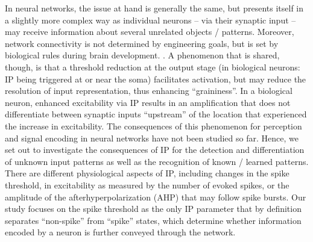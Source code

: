 In neural networks, the issue at hand is generally the same,
        but presents itself in a slightly more complex way as individual neurons
        -- via their synaptic input --
        may receive information about several unrelated objects / patterns.
        Moreover, network connectivity is not determined by engineering goals,
            but is set by biological rules during brain development.
    .
    A phenomenon that is shared, though, is that a threshold reduction at the output stage
        (in biological neurons: IP being triggered at or near the soma) facilitates activation,
        but may reduce the resolution of input representation, thus enhancing ``graininess''.
    In a biological neuron, enhanced excitability via IP results in an amplification
        that does not differentiate between synaptic inputs ``upstream'' of the location
            that experienced the increase in excitability.
    The consequences of this phenomenon for perception and signal encoding in neural networks
        have not been studied so far.
    Hence, we set out to investigate the consequences of IP
        for the detection and differentiation of unknown input patterns
            as well as the recognition of known / learned patterns.
    There are different physiological aspects of IP,
        including changes in the spike threshold,
        in excitability as measured by the number of evoked spikes,
        or the amplitude of the afterhyperpolarization (AHP) that may follow spike bursts.
    Our study focuses on the spike threshold as the only IP parameter
        that by definition separates ``non-spike'' from ``spike'' states,
        which determine whether information encoded by a neuron is further conveyed through the network.

